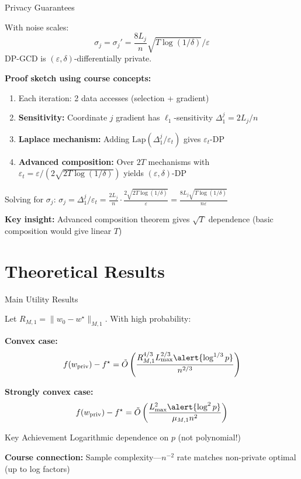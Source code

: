 \documentclass[10pt]{beamer}
\begin{document}
\begin{frame}{Privacy Guarantees}
\begin{theorem}
With noise scales:
\[
\sigma_j = \sigma_j' = \frac{8L_j}{n} \sqrt{T \log(1/\delta)} / \varepsilon
\]
DP-GCD is $(\varepsilon, \delta)$-differentially private.
\end{theorem}

\vspace{0.5em}
\textbf{Proof sketch using course concepts:}
\begin{enumerate}
\item Each iteration: 2 data accesses (selection + gradient)
\item \textbf{Sensitivity:} Coordinate $j$ gradient has $\ell_1$-sensitivity $\Delta_1^j = 2L_j/n$
\item \textbf{Laplace mechanism:} Adding $\text{Lap}(\Delta_1^j/\varepsilon_t)$ gives $\varepsilon_t$-DP
\item \textbf{Advanced composition:} Over $2T$ mechanisms with $\varepsilon_t = \varepsilon/(2\sqrt{2T\log(1/\delta)})$ yields $(\varepsilon, \delta)$-DP
\end{enumerate}

\vspace{0.5em}
Solving for $\sigma_j$: $\sigma_j = \Delta_1^j/\varepsilon_t = \frac{2L_j}{n} \cdot \frac{2\sqrt{2T\log(1/\delta)}}{\varepsilon} = \frac{8L_j\sqrt{T\log(1/\delta)}}{n\varepsilon}$

\vspace{0.3em}
\textbf{Key insight:} Advanced composition theorem gives $\sqrt{T}$ dependence (basic composition would give linear $T$)
\end{frame}

\section{Theoretical Results}

\begin{frame}{Main Utility Results}
\begin{theorem}
Let $R_{M,1} = \|w_0 - w^\star\|_{M,1}$. With high probability:

\vspace{0.5em}
\textbf{Convex case:}
\[
f(w_\text{priv}) - f^\star = \tilde{O}\left( \frac{R_{M,1}^{4/3} L_{\max}^{2/3} \alert{\log^{1/3} p}}{n^{2/3}} \right)
\]

\textbf{Strongly convex case:}
\[
f(w_\text{priv}) - f^\star = \tilde{O}\left( \frac{L_{\max}^2 \alert{\log^2 p}}{\mu_{M,1} n^2} \right)
\]
\end{theorem}

\vspace{1em}
\begin{alertblock}{Key Achievement}
\alert{Logarithmic} dependence on $p$ (not polynomial!)
\end{alertblock}

\vspace{0.3em}
\textbf{Course connection:} Sample complexity---$n^{-2}$ rate matches non-private optimal (up to log factors)
\end{frame}
\end{document}
